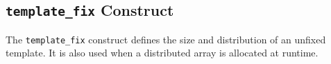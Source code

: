 










\subsection{{\tt template\_fix} Construct}

The {\tt template\_fix} construct defines the size and distribution of an
unfixed template. It is also used when a distributed array is allocated
at runtime.

